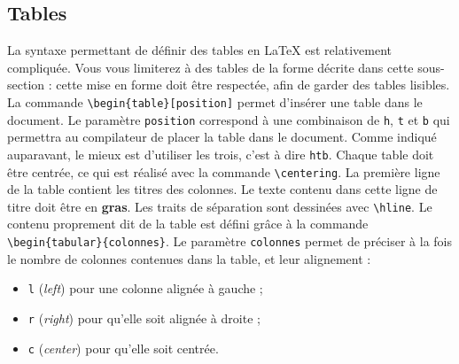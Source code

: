 \documentclass{ceri}
\begin{document}
\subsection{Tables}
\label{sec:tables}
La syntaxe permettant de définir des tables en \LaTeX{} est relativement compliquée. Vous vous limiterez à des tables de la forme décrite dans cette sous-section : cette mise en forme doit être respectée, afin de garder des tables lisibles. La commande \texttt{\textbackslash{}begin\{table\}[position]} permet d'insérer une table dans le document. Le paramètre \texttt{position} correspond à une combinaison de \texttt{h}, \texttt{t} et \texttt{b} qui permettra au compilateur de placer la table dans le document. Comme indiqué auparavant, le mieux est d'utiliser les trois, c'est à dire \texttt{htb}.
Chaque table doit être centrée, ce qui est réalisé avec la commande \texttt{\textbackslash{}centering}. La première ligne de la table contient les titres des colonnes. Le texte contenu dans cette ligne de titre doit être en \textbf{gras}. Les traits de séparation sont dessinées avec \texttt{\textbackslash{}hline}.
Le contenu proprement dit de la table est défini grâce à la commande \texttt{\textbackslash{}begin\{tabular\}\{colonnes\}}. Le paramètre \texttt{colonnes} permet de préciser à la fois le nombre de colonnes contenues dans la table, et leur alignement : 
\begin{itemize}
	\item \texttt{l} (\textit{left}) pour une colonne alignée à gauche ;
	\item \texttt{r} (\textit{right}) pour qu'elle soit alignée à droite ;
	\item \texttt{c} (\textit{center}) pour qu'elle soit centrée.
\end{itemize}
\end{document}
